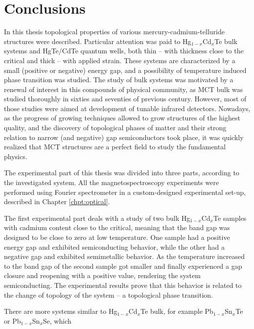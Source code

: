 \documentclass[titlepage,a4paper]{book}
\newcommand{\wciecie}{\quad\phantom{v}}
\begin{document}
\chapter{Conclusions}
\wciecie
In this thesis topological properties of various mercury-cadmium-telluride structures were described. Particular attention was paid to Hg$_{1-x}$Cd$_{x}$Te bulk systems and HgTe/CdTe quantum wells, both thin -- with thickness close to the critical and thick -- with applied strain. These systems are characterized by a small (positive or negative) energy gap, and a possibility of temperature induced phase transition was studied. The study of bulk systems was motivated by a renewal of interest in this compounds of physical community, as MCT bulk was studied thoroughly in sixties and seventies of previous century. However, most of those studies were aimed at development of tunable infrared detectors. Nowadays, as the progress of growing techniques allowed to grow structures of the highest quality, and the discovery of topological phases of matter and their strong relation to narrow (and negative) gap semiconductors took place, it was quickly realized that MCT structures are a perfect field to study the fundamental physics.

The experimental part of this thesis was divided into three parts, according to the investigated system. All the magnetospectroscopy experiments were performed using Fourier spectrometer in a custom-designed experimental set-up, described in Chapter \ref{chpt:optical}. 

The first experimental part deals with a study of two bulk Hg$_{1-x}$Cd$_{x}$Te samples with cadmium content close to the critical, meaning that the band gap was designed to be close to zero at low temperature. One sample had a positive energy gap and exhibited semiconducting behavior, while the other had a negative gap and exhibited semimetallic behavior. As the temperature increased to the band gap of the second sample got smaller and finally experienced a gap closure and reopening with a positive value, rendering the system semiconducting. The experimental results prove that this behavior is related to the change of topology of the system -- a topological phase transition.


There are more systems similar to Hg$_{1-x}$Cd$_{x}$Te bulk, for example Pb$_{1-x}$Sn$_{x}$Te or Pb$_{1-x}$Sn$_{x}$Se, which
\end{document}
